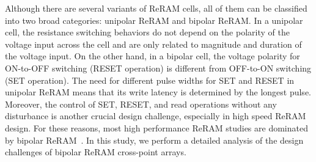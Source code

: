 Although there are several variants of ReRAM cells, all of them can be
classified into two broad categories: unipolar ReRAM and bipolar ReRAM. In
a unipolar cell, the resistance switching behaviors do not depend on the
polarity of the voltage input across the cell and are only related to magnitude
and duration of the voltage input. On the other hand, in a bipolar cell,
the voltage polarity for ON-to-OFF switching (RESET operation) is
different from OFF-to-ON switching (SET operation).
The need for different pulse widths for SET and RESET in unipolar ReRAM
means that its write latency is determined by the longest pulse.
Moreover, the control of SET, RESET, and read operations without any
disturbance is another crucial design challenge, especially in high speed
ReRAM design. For these reasons, most high performance ReRAM studies are
dominated by bipolar
ReRAM~\cite{ReRAM_IEDM2010_Kim,ReRAM_ISSCC2011_Sheu,ReRAM_ISSCC2011_Otsuka}.
In this study, we perform a detailed analysis of the design challenges of
bipolar ReRAM cross-point arrays.

